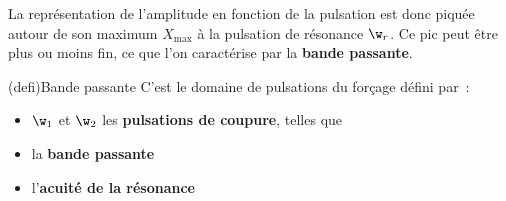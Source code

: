 \documentclass[../../main/main.tex]{subfiles}
\begin{document}
La représentation de l'amplitude en fonction de la pulsation est donc piquée
autour de son maximum $X_{\max}$ à la pulsation de résonance $\w_r$. Ce pic peut
être plus ou moins fin, ce que l'on caractérise par la \textbf{bande passante}.
\begin{tcb*}[sidebyside, righthand ratio=.4](defi){Bande passante}
	C'est le domaine de pulsations du forçage défini par~:
	\psw{
		\[
			\text{bande passante}
			\triangleq
			\left\{%
			\w ~|~ X(\w) \geq X\ind{max, eff} = \frac{X\ind{max}}{\sqrt{2}}\right
			\}
		\]
	}
	\begin{itemize}
		\item $\w_1$ et $\w_2$ les \textbf{pulsations de coupure}, telles que
		      \psw{%
			      \[
				      X(\w_{1,2}) = \frac{X\ind{max}}{\sqrt{2}}
			      \]
		      }%
		      \vspace{-15pt}
		\item la \textbf{bande passante}
		\item l'\textbf{acuité de la résonance}
	\end{itemize}
	\tcblower
	\begin{center}
\end{center}
\end{tcb*}
\end{document}
